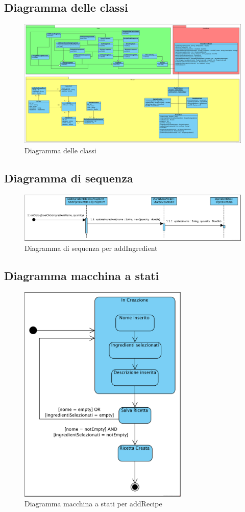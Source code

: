 \documentclass[12pt]{article}
\begin{document}
\subsection{Diagramma delle classi}
\begin{figure}[H]
\centering
\includegraphics[width=440px]{diagramma_classi.png}
\caption{\label{fig:diagramma_delle_classi}Diagramma delle classi}
\end{figure}


\subsection{Diagramma di sequenza}
\begin{figure}[H]
\centering
\includegraphics[width=440px]{SD_addIngredient.png}
\caption{\label{fig:diagramma_di_sequenza}Diagramma di sequenza per addIngredient}
\end{figure}


\subsection{Diagramma macchina a stati}
\begin{figure}[H]
\centering
\includegraphics[height=400px]{diagramma_macchina_stati_addRecipe.png}
\caption{\label{fig:diagramma_macchina_a_stati}Diagramma macchina a stati per addRecipe}
\end{figure}
\end{document}
